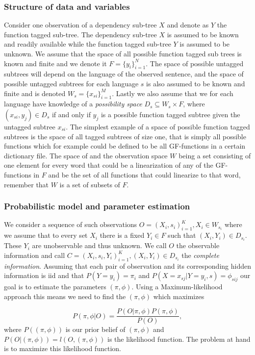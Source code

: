 \subsubsection{Structure of data and variables}
Consider one observation of a dependency sub-tree $X$ and denote as $Y$ the function tagged sub-tree. The dependency sub-tree $X$ is assumed to be known and readily available while the function tagged sub-tree $Y$ is assumed to be unknown. We assume that the space of all possible function tagged sub trees is known and finite and we denote it $F=\{y_i\}_{i=1}^N$. The space of possible untagged subtrees will depend on the language of the observed sentence, and the space of possible untagged subtrees for each language $s$ is also assumed to be known and finite and is denoted $W_s=\{x_{si}\}_{i=1}^M$. Lastly we also assume that we for each language have knowledge of a \emph{possibility space} $D_s\subseteq W_s \times F$, where $(x_{si},y_j)\in D_s$ if and only if $y_j$ is a possible function tagged subtree given the untagged subtree $x_{si}$. The simplest example of a space of possible function tagged subtrees is the space of all tagged subtrees of size one, that is simply all possible functions which for example could be defined to be all GF-functions in a certain dictionary file. The space of  and the observation space $W$ being a set consisting of one element for every word that could be a linearization of any of the GF-functions in $F$ and be the set of all functions that could linearize to that word, remember that $W$ is a set of subsets of $F$.
\subsubsection{Probabilistic model and parameter estimation}
We consider a sequence of such observations $O=(X_i, s_i)_{i=1}^K, X_i\in W_{s_i}$ where we assume that to every set $X_i$ there is a fixed $Y_i\in F$ such that $(X_i,Y_i)\in D_{s_i}$. These $Y_i$ are unobservable and thus unknown. We call $O$ the observable information and call $C = (X_i,s_i, Y_i)_{i=1}^K, (X_i,Y_i)\in D_{s_i}$ the \emph{complete information}. Assuming that each pair of observation and its corresponding hidden information is iid and that $P(Y=y_i)=\pi_i$ and $P(X=x_{sj} | Y=y_i, s) = \phi_{sij}$ our goal is to estimate the parameters $(\pi, \phi)$. Using a Maximum-likelihood approach this means we need to find the $(\pi, \phi)$ which maximizes 

\begin{equation*}
P(\pi, \phi | O)=\frac{P(O | \pi, \phi)P(\pi, \phi)}{P(O)},
\end{equation*}
where $P((\pi, \phi))$ is our prior belief of $(\pi, \phi)$ and $P(O | (\pi, \phi)) = l(O,(\pi, \phi))$ is the likelihood function. The problem at hand is to maximize this likelihood function.

